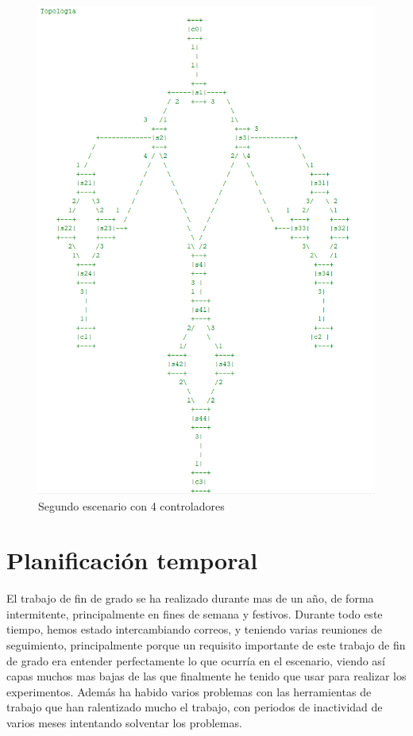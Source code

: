 \documentclass[a4paper, 12pt]{book}
\begin{document}
	\begin{figure}
		\centering
		\includegraphics[width=16cm, keepaspectratio]{img/mesh4c}
		\caption{Segundo escenario con 4 controladores}
		\label{figura:mesh4c}
	\end{figure}
	
	\section{Planificación temporal}
	\label{sec:planificacion-temporal}
	
	El trabajo de fin de grado se ha realizado durante mas de un año, de forma intermitente, principalmente en fines de semana y festivos. Durante todo este tiempo, hemos estado intercambiando correos, y teniendo varias reuniones de seguimiento, principalmente porque un requisito importante de este trabajo de fin de grado era entender perfectamente lo que ocurría en el escenario, viendo así capas muchos mas bajas de las que finalmente he tenido que usar para realizar los experimentos.
	Además ha habido varios problemas con las herramientas de trabajo que han ralentizado mucho el trabajo, con periodos de inactividad de varios meses intentando solventar los problemas.
	
\end{document}
